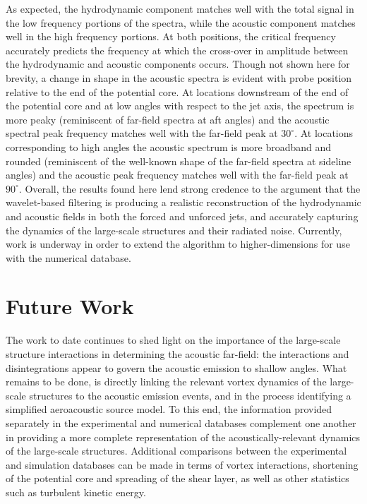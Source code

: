 \documentclass[english]{aiaa-tc}
\begin{document}
As expected, the hydrodynamic component matches well with the total
signal in the low frequency portions of the spectra, while the
acoustic component matches well in the high frequency portions. At
both positions, the critical frequency accurately predicts the
frequency at which the cross-over in amplitude between the
hydrodynamic and acoustic components occurs. Though not shown here for
brevity, a change in shape in the acoustic spectra is evident with
probe position relative to the end of the potential core. At locations
downstream of the end of the potential core and at low angles with
respect to the jet axis, the spectrum is more peaky (reminiscent of
far-field spectra at aft angles) and the acoustic spectral peak
frequency matches well with the far-field peak at $30^{\circ}$. At
locations corresponding to high angles the acoustic spectrum is more
broadband and rounded (reminiscent of the well-known shape of the
far-field spectra at sideline angles) and the acoustic peak frequency
matches well with the far-field peak at $90^{\circ}$. Overall, the
results found here lend strong credence to the argument that the
wavelet-based filtering is producing a realistic reconstruction of the
hydrodynamic and acoustic fields in both the forced and unforced jets,
and accurately capturing the dynamics of the large-scale structures
and their radiated noise. Currently, work is underway in order to
extend the algorithm to higher-dimensions for use with the numerical
database.

\section{Future Work}
The work to date continues to shed light on the importance of the
large-scale structure interactions in determining the acoustic
far-field: the interactions and disintegrations
appear to govern the acoustic emission to shallow angles. What remains to be done, is
directly linking the relevant vortex dynamics of the large-scale
structures to the acoustic emission events, and in the process
identifying a simplified aeroacoustic source model. To this end,
the information provided separately in the experimental and numerical
databases complement one another in providing a
more complete representation of the acoustically-relevant dynamics of
the large-scale structures. Additional comparisons between the
experimental and simulation databases can be made in terms of vortex
interactions, shortening of the potential core and spreading of the
shear layer, as well as other statistics such as turbulent kinetic
energy. 
\end{document}
